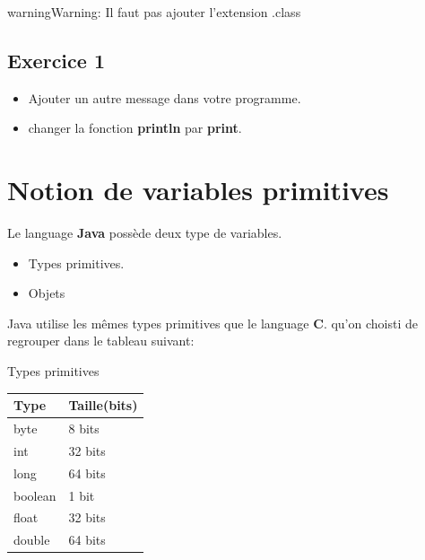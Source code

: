 \documentclass[letterpaper,10pt,english]{sphinxmanual}
\begin{document}
\begin{notice}{warning}{Warning:}
Il faut pas ajouter l'extension .class
\end{notice}


\subsection{Exercice 1}
\label{hello_world:exercice-1}\begin{itemize}
\item {} 
Ajouter un autre message dans votre programme.

\item {} 
changer la fonction \textbf{println} par \textbf{print}.

\end{itemize}


\section{Notion de variables primitives}
\label{variables:notion-de-variables-primitives}\label{variables::doc}
Le language \textbf{Java} possède deux type de variables.
\begin{itemize}
\item {} 
Types primitives.

\item {} 
Objets

\end{itemize}

Java utilise les mêmes types primitives que le language \textbf{C}. qu'on choisti de regrouper dans le tableau suivant:


\begin{threeparttable}
\capstart\caption{Types primitives}

\begin{tabulary}{\linewidth}{|L|L|}
\hline
\textsf{\relax 
Type
} & \textsf{\relax 
Taille(bits)
}\\
\hline
byte
 & 
8  bits
\\
\hline
int
 & 
32 bits
\\
\hline
long
 & 
64 bits
\\
\hline
boolean
 & 
1 bit
\\
\hline
float
 & 
32 bits
\\
\hline
double
 & 
64 bits
\\
\hline\end{tabulary}

\end{threeparttable}
\end{document}
